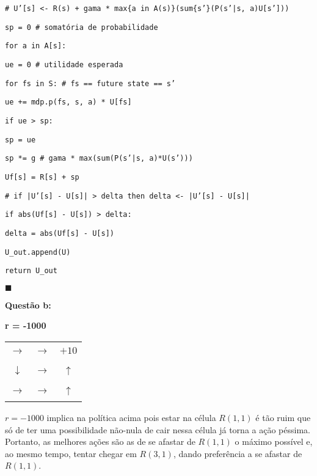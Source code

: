 \documentclass{article}
\begin{document}
\qquad\qquad\qquad\texttt{\# U'[s] <- R(s) + gama * max\{a in A(s)\}(sum\{s'\}(P(s'|s, a)U[s']))}

\qquad\qquad\qquad\texttt{sp = 0 \# somatória de probabilidade}

\qquad\qquad\qquad\texttt{for a in A[s]:}

\qquad\qquad\qquad\quad\texttt{ue = 0 \# utilidade esperada}

\qquad\qquad\qquad\quad\texttt{for fs in S: \# fs == future state == s'}

\qquad\qquad\qquad\qquad\texttt{ue += mdp.p(fs, s, a) * U[fs]}

\qquad\qquad\qquad\quad\texttt{if ue > sp:}

\qquad\qquad\qquad\qquad\texttt{sp = ue}

\qquad\qquad\qquad\texttt{sp *= g \# gama * max(sum(P(s'|s, a)*U(s')))}

\qquad\qquad\qquad\texttt{Uf[s] = R[s] + sp}

\bigskip
\qquad\qquad\qquad\texttt{\# if |U'[s] - U[s]| > delta then delta <- |U'[s] - U[s]|}

\qquad\qquad\qquad\texttt{if abs(Uf[s] - U[s]) > delta:}

\qquad\qquad\qquad\quad\texttt{delta = abs(Uf[s] - U[s])}

\bigskip
\qquad\qquad\texttt{U\_out.append(U)}

\bigskip
\qquad\quad\texttt{return U\_out}

\begin{flushright}
$\blacksquare$
\end{flushright}

\quad \large{\textbf{Questão b:}}

\begin{center}
	\textbf{r = -1000}
	
	\begin{tabular}{| c | c | c |}
		\hline
			& & \\ 
			\LARGE{$\rightarrow$} & \LARGE{$\rightarrow$} & \LARGE{$+10$} \\
			& & \\ \hline
			& & \\
			\LARGE{$\downarrow$} & \LARGE{$\rightarrow$} & \LARGE{$\uparrow$} \\
			& & \\ \hline
			& & \\
			\LARGE{$\rightarrow$} & \LARGE{$\rightarrow$} & \LARGE{$\uparrow$} \\
			& & \\ \hline
	\end{tabular}
	
	$r = -1000$ implica na política acima pois estar na célula $R(1, 1)$ é tão ruim que só de ter uma possibilidade não-nula de cair nessa célula já torna a ação péssima. Portanto, as melhores ações são as de se afastar de $R(1, 1)$ o máximo possível e, ao mesmo tempo, tentar chegar em $R(3, 1)$, dando preferência a se afastar de $R(1, 1)$.
\end{center}
\end{document}

